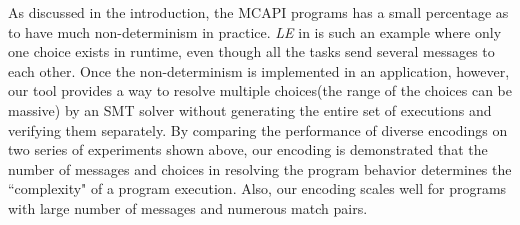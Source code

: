As discussed in the introduction, the MCAPI programs has a small percentage as to have much non-determinism in practice. \textit{LE} in  is such an example where only one choice exists in runtime, even though all the tasks send several messages to each other. Once the non-determinism is implemented in an application, however, our tool provides a way to resolve multiple choices(the range of the choices can be massive) by an SMT solver without generating the entire set of executions and verifying them separately. By comparing the performance of diverse encodings on two series of experiments shown above, our encoding is demonstrated that the number of messages and choices in resolving the program behavior determines the ``complexity" of a program execution. Also, our encoding scales well for programs with large number of messages and numerous match pairs.

